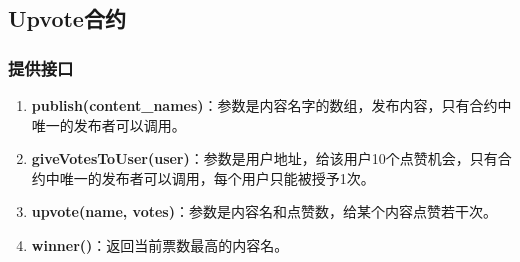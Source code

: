 \documentclass[a4paper, 11pt]{article}
\begin{document}
\subsection{Upvote合约}
\subsubsection{提供接口}
\begin{enumerate}
      \item \textbf{publish(content\_names)}：参数是内容名字的数组，发布内容，只有合约中唯一的发布者可以调用。
      \item \textbf{giveVotesToUser(user)}：参数是用户地址，给该用户10个点赞机会，只有合约中唯一的发布者可以调用，每个用户只能被授予1次。
      \item \textbf{upvote(name, votes)}：参数是内容名和点赞数，给某个内容点赞若干次。
      \item \textbf{winner()}：返回当前票数最高的内容名。
\end{enumerate}
\end{document}
